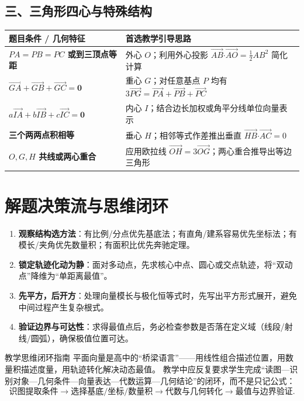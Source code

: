 \documentclass[11pt,a4paper,openany]{ctexbook}
\newcommand{\vect}[1]{\overrightarrow{#1}}
\newcommand{\vv}[1]{\bm{#1}}
\newcommand{\dotp}{\mathbin{\boldsymbol\cdot}}
\begin{document}
\subsection{三、三角形四心与特殊结构}
\begin{center}
\begin{tabularx}{0.98\textwidth}{>{\bfseries}p{4.2cm}X}
\toprule
题目条件 / 几何特征 & 首选教学引导思路\\
\midrule
\(PA=PB=PC\) 或到三顶点等距 & 外心 \(O\)；利用外心投影 \(\vect{AB}\dotp\vect{AO}=\frac12AB^2\) 简化计算\\
\(\vect{GA}+\vect{GB}+\vect{GC}=\vv0\) & 重心 \(G\)；对任意基点 \(P\) 均有 \(3\vect{PG}=\vect{PA}+\vect{PB}+\vect{PC}\)\\
\(a\vect{IA}+b\vect{IB}+c\vect{IC}=\vv0\) & 内心 \(I\)；结合边长加权或角平分线单位向量表示\\
三个两两点积相等 & 垂心 \(H\)；相邻等式作差推出垂直 \(\vect{HB}\dotp\vect{AC}=0\)\\
\(O,G,H\) 共线或两心重合 & 应用欧拉线 \(\vect{OH}=3\vect{OG}\)；两心重合推导出等边三角形\\
\bottomrule
\end{tabularx}
\end{center}

\section{解题决策流与思维闭环}

\begin{methodbox}[title={教学解题四步决策流}]
\begin{enumerate}
  \item \textbf{观察结构选方法}：有比例/分点优先基底法；有直角/建系容易优先坐标法；有模长/夹角优先数量积；有面积比优先奔驰定理。
  \item \textbf{锁定轨迹化动为静}：面对多动点，先求核心中点、圆心或交点轨迹，将“双动点”降维为“单距离最值”。
  \item \textbf{先平方，后开方}：处理向量模长与极化恒等式时，先写出平方形式展开，避免中间过程产生复杂根式。
  \item \textbf{验证边界与可达性}：求得最值点后，务必检查参数是否落在定义域（线段/射线/圆弧），确保极值位置可达。
\end{enumerate}
\end{methodbox}

\begin{summarybox}{教学思维闭环指南}
平面向量是高中的“桥梁语言”——用线性组合描述位置，用数量积描述度量，用轨迹转化解决动态最值。
教学中应反复要求学生完成“读图—识别对象—几何条件—向量表达—代数运算—几何结论”的闭环，而不是只记公式：
\[
\text{识图提取条件}
\longrightarrow
\text{选择基底/坐标/数量积}
\longrightarrow
\text{代数与几何转化}
\longrightarrow
\text{最值与边界验证}.
\]
\end{summarybox}
\end{document}

